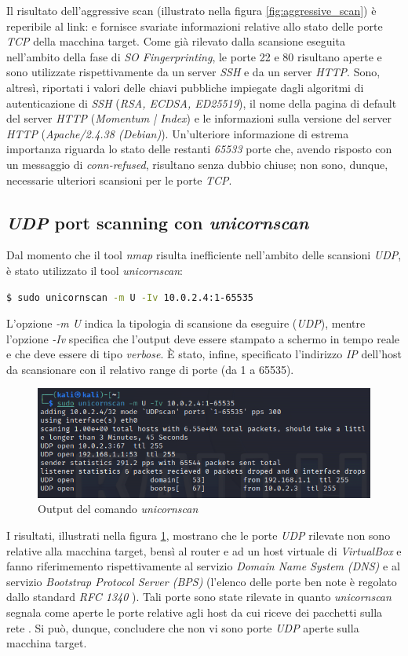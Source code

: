 Il risultato dell'aggressive scan (illustrato nella figura \ref{fig:aggressive_scan}) è reperibile al link: e fornisce svariate informazioni relative allo stato delle porte \emph{TCP} della macchina target. Come già rilevato dalla scansione eseguita nell'ambito della fase di \emph{SO Fingerprinting}, le porte 22 e 80 risultano aperte e sono utilizzate rispettivamente da un server \emph{SSH} e da un server \emph{HTTP}. Sono, altresì, riportati i valori delle chiavi pubbliche impiegate dagli algoritmi di autenticazione di \emph{SSH} (\emph{RSA, ECDSA, ED25519}), il nome della pagina di default del server \emph{HTTP} (\emph{Momentum | Index}) e le informazioni sulla versione del server \emph{HTTP} (\emph{Apache/2.4.38 (Debian)}). Un'ulteriore informazione di estrema importanza riguarda lo stato delle restanti \emph{65533} porte che, avendo risposto con un messaggio di \emph{conn-refused}, risultano senza dubbio chiuse; non sono, dunque, necessarie ulteriori scansioni per le porte \emph{TCP}. 
\subsection{\emph{UDP} port scanning con \emph{unicornscan}}
Dal momento che il tool \emph{nmap} risulta inefficiente nell'ambito delle scansioni \emph{UDP}, è stato utilizzato il tool \emph{unicornscan}:
\begin{lstlisting}[language=bash]
    $ sudo unicornscan -m U -Iv 10.0.2.4:1-65535
\end{lstlisting}
L'opzione \emph{-m U} indica la tipologia di scansione da eseguire (\emph{UDP}), mentre l'opzione \emph{-Iv} specifica che l'output deve essere stampato a schermo in tempo reale e che deve essere di tipo \emph{verbose}. È stato, infine, specificato l'indirizzo \emph{IP} dell'host da scansionare con il relativo range di porte (da 1 a 65535).  
\begin{figure}[h]
    \centering
    \includegraphics[scale=0.7]{capitoli/images/udp.png}
    \caption{Output del comando \emph{unicornscan}}
    \label{fig:unicornscan}
\end{figure}
I risultati, illustrati nella figura \ref{fig:unicornscan}, mostrano che le porte \emph{UDP} rilevate non sono relative alla macchina target, bensì al router e ad un host virtuale di \emph{VirtualBox} e fanno riferimemento rispettivamente al servizio \emph{Domain Name System (DNS)} e al servizio \emph{Bootstrap Protocol Server (BPS)} (l'elenco delle porte ben note è regolato dallo standard \emph{RFC 1340} \cite{rfc1340}). Tali porte sono state rilevate in quanto \emph{unicornscan} segnala come aperte le porte relative agli host da cui riceve dei pacchetti sulla rete \cite{unicornscan}. Si può, dunque, concludere che non vi sono porte \emph{UDP} aperte sulla macchina target. 
